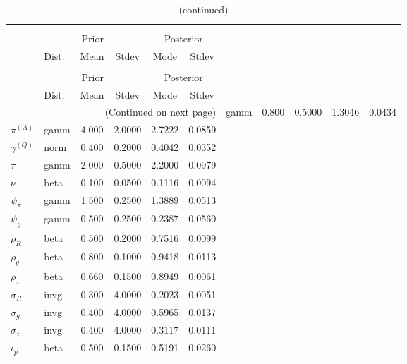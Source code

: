  
\begin{center}
\begin{longtable}{llcccc} 
\caption{Results from posterior maximization (parameters)}\\
 \label{Table:Posterior:1}\\
\toprule 
  & \multicolumn{3}{c}{Prior}  &  \multicolumn{2}{c}{Posterior} \\
  \cmidrule(r{.75em}){2-4} \cmidrule(r{.75em}){5-6}
  & Dist. & Mean  & Stdev & Mode & Stdev \\ 
\midrule \endfirsthead 
\caption{(continued)}\\
 \bottomrule 
  & \multicolumn{3}{c}{Prior}  &  \multicolumn{2}{c}{Posterior} \\
  \cmidrule(r{.75em}){2-4} \cmidrule(r{.75em}){5-6}
  & Dist. & Mean  & Stdev & Mode & Stdev \\ 
\midrule \endhead 
\bottomrule \multicolumn{6}{r}{(Continued on next page)}\endfoot 
\bottomrule\endlastfoot 
${r_{A}}$ & gamm &   0.800 & 0.5000 &   1.3046 &  0.0434 \\ 
${\pi^{(A)}}$ & gamm &   4.000 & 2.0000 &   2.7222 &  0.0859 \\ 
${\gamma^{(Q)}}$ & norm &   0.400 & 0.2000 &   0.4042 &  0.0352 \\ 
${\tau}$ & gamm &   2.000 & 0.5000 &   2.2000 &  0.0979 \\ 
${\nu}$ & beta &   0.100 & 0.0500 &   0.1116 &  0.0094 \\ 
${\psi_\pi}$ & gamm &   1.500 & 0.2500 &   1.3889 &  0.0513 \\ 
${\psi_y}$ & gamm &   0.500 & 0.2500 &   0.2387 &  0.0560 \\ 
${\rho_R}$ & beta &   0.500 & 0.2000 &   0.7516 &  0.0099 \\ 
${\rho_{g}}$ & beta &   0.800 & 0.1000 &   0.9418 &  0.0113 \\ 
${\rho_z}$ & beta &   0.660 & 0.1500 &   0.8949 &  0.0061 \\ 
${\sigma_R}$ & invg &   0.300 & 4.0000 &   0.2023 &  0.0051 \\ 
${\sigma_{g}}$ & invg &   0.400 & 4.0000 &   0.5965 &  0.0137 \\ 
${\sigma_z}$ & invg &   0.400 & 4.0000 &   0.3117 &  0.0111 \\ 
${\iota_p}$ & beta &   0.500 & 0.1500 &   0.5191 &  0.0260 \\ 
\end{longtable}
 \end{center}
